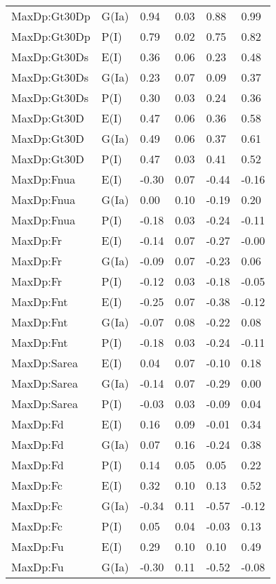 \begin{center}
\begin{longtable}{|p{1.1in}|p{0.7in}|p{0.7in}|p{0.6in}|p{0.6in}|p{0.6in}|}
  MaxDp:Gt30Dp & G(Ia) & 0.94 & 0.03 & 0.88 & 0.99 \\ 
  MaxDp:Gt30Dp & P(I) & 0.79 & 0.02 & 0.75 & 0.82 \\ 
  MaxDp:Gt30Ds & E(I) & 0.36 & 0.06 & 0.23 & 0.48 \\ 
  MaxDp:Gt30Ds & G(Ia) & 0.23 & 0.07 & 0.09 & 0.37 \\ 
  MaxDp:Gt30Ds & P(I) & 0.30 & 0.03 & 0.24 & 0.36 \\ 
  MaxDp:Gt30D & E(I) & 0.47 & 0.06 & 0.36 & 0.58 \\ 
  MaxDp:Gt30D & G(Ia) & 0.49 & 0.06 & 0.37 & 0.61 \\ 
  MaxDp:Gt30D & P(I) & 0.47 & 0.03 & 0.41 & 0.52 \\ 
  MaxDp:Fnua & E(I) & -0.30 & 0.07 & -0.44 & -0.16 \\ 
  MaxDp:Fnua & G(Ia) & 0.00 & 0.10 & -0.19 & 0.20 \\ 
  MaxDp:Fnua & P(I) & -0.18 & 0.03 & -0.24 & -0.11 \\ 
  MaxDp:Fr & E(I) & -0.14 & 0.07 & -0.27 & -0.00 \\ 
  MaxDp:Fr & G(Ia) & -0.09 & 0.07 & -0.23 & 0.06 \\ 
  MaxDp:Fr & P(I) & -0.12 & 0.03 & -0.18 & -0.05 \\ 
  MaxDp:Fnt & E(I) & -0.25 & 0.07 & -0.38 & -0.12 \\ 
  MaxDp:Fnt & G(Ia) & -0.07 & 0.08 & -0.22 & 0.08 \\ 
  MaxDp:Fnt & P(I) & -0.18 & 0.03 & -0.24 & -0.11 \\ 
  MaxDp:Sarea & E(I) & 0.04 & 0.07 & -0.10 & 0.18 \\ 
  MaxDp:Sarea & G(Ia) & -0.14 & 0.07 & -0.29 & 0.00 \\ 
  MaxDp:Sarea & P(I) & -0.03 & 0.03 & -0.09 & 0.04 \\ 
  MaxDp:Fd & E(I) & 0.16 & 0.09 & -0.01 & 0.34 \\ 
  MaxDp:Fd & G(Ia) & 0.07 & 0.16 & -0.24 & 0.38 \\ 
  MaxDp:Fd & P(I) & 0.14 & 0.05 & 0.05 & 0.22 \\ 
  MaxDp:Fc & E(I) & 0.32 & 0.10 & 0.13 & 0.52 \\ 
  MaxDp:Fc & G(Ia) & -0.34 & 0.11 & -0.57 & -0.12 \\ 
  MaxDp:Fc & P(I) & 0.05 & 0.04 & -0.03 & 0.13 \\ 
  MaxDp:Fu & E(I) & 0.29 & 0.10 & 0.10 & 0.49 \\ 
  MaxDp:Fu & G(Ia) & -0.30 & 0.11 & -0.52 & -0.08 \\ 

\end{longtable}
\end{center}
